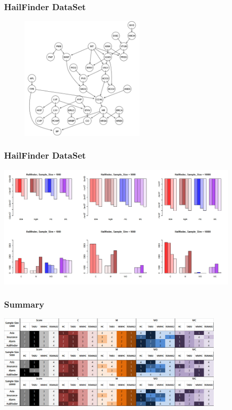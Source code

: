 \documentclass{beamer}
\begin{document}
\begin{frame}
\frametitle{HailFinder DataSet}
{\scriptsize{}
	\begin{figure}
		\includegraphics[height=170pt]{images/image04}
	\end{figure}	
}
\end{frame}


\begin{frame}
\frametitle{HailFinder DataSet}
{\scriptsize{}
		\includegraphics[height=170pt]{images/Real_4_Halifinder}
}
\end{frame}


\begin{frame}
\frametitle{Summary}
{\scriptsize{}
	\begin{center}
		\includegraphics[height=130pt]{images/Real_Result}
	\end{center}
}
\end{frame}
\end{document}
